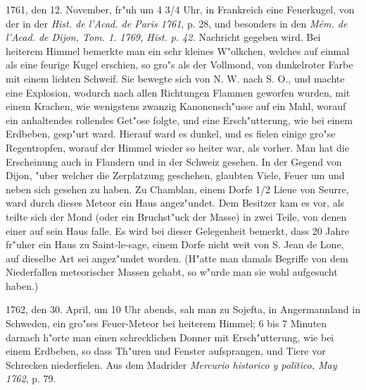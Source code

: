 \documentclass[a4paper, 11pt, oneside, polutonikogreek, german]{article}
\begin{document}
1761, den 12. November, fr"uh um 4 3/4 Uhr, in Frankreich eine Feuerkugel, von der in der \emph{Hist. de l'Acad. de Paris 1761}, p. 28, und besonders in den \emph{Mém. de l'Acad. de Dijon, Tom. 1. 1769, Hist. p. 42.} Nachricht gegeben wird. Bei heiterem Himmel bemerkte man ein sehr kleines W"olkchen, welches auf einmal als eine feurige Kugel erschien, so gro"s als der Vollmond, von dunkelroter Farbe mit einem lichten Schweif. Sie bewegte sich von N. W. nach S. O., und machte eine Explosion, wodurch nach allen Richtungen Flammen geworfen wurden, mit einem Krachen, wie wenigstens zwanzig Kanonensch"usse auf ein Mahl, worauf ein anhaltendes rollendes Get"ose folgte, und eine Ersch"utterung, wie bei einem Erdbeben, gesp"urt ward. Hierauf ward es dunkel, und es fielen einige gro"se Regentropfen, worauf der Himmel wieder so heiter war, als vorher. Man hat die Erscheinung auch in Flandern und in der Schweiz gesehen. In der Gegend von Dijon, "uber welcher die Zerplatzung geschehen, glaubten Viele, Feuer um und neben sich gesehen zu haben. Zu Chamblan, einem Dorfe 1/2 Lieue von Seurre, ward durch dieses Meteor ein Haus angez"undet. Dem Besitzer kam es vor, als teilte sich der Mond (oder ein Bruchst"uck der Masse) in zwei Teile, von denen einer auf sein Haus falle. Es wird bei dieser Gelegenheit bemerkt, dass 20 Jahre fr"uher ein Haus zu Saint-le-sage, einem Dorfe nicht weit von S. Jean de Lone, auf dieselbe Art sei angez"undet worden. (H"atte man damals Begriffe von dem Niederfallen meteorischer Massen gehabt, so w"urde man sie wohl aufgesucht haben.)

1762, den 30. April, um 10 Uhr abends, sah man zu Sojefta, in Angermannland in Schweden, ein gro"ses Feuer-Meteor bei heiterem Himmel; 6 bis 7 Minuten darnach h"orte man einen schrecklichen Donner mit Ersch"utterung, wie bei einem Erdbeben, so dass Th"uren und Fenster aufsprangen, und Tiere vor Schrecken niederfielen. Aus dem Madrider \emph{Mercurio historico y politico, May 1762}, p. 79.
\end{document}
